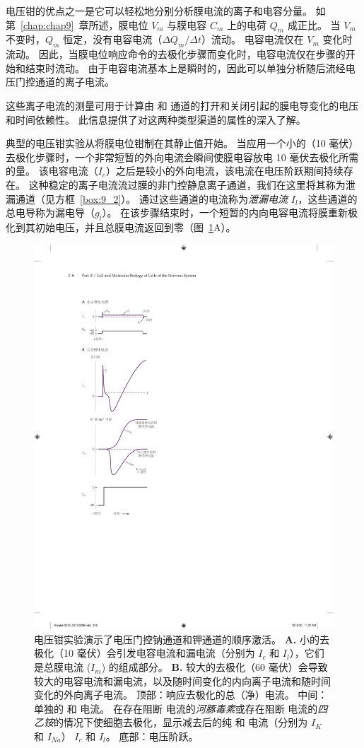 电压钳的优点之一是它可以轻松地分别分析膜电流的离子和电容分量。
如第~\ref{chap:chap9}~章所述，膜电位 $V_m$ 与膜电容 $C_m$ 上的电荷 $Q_m$ 成正比。
当 $V_m$ 不变时，$Q_m$ 恒定，没有电容电流（$\Delta Q_m / \Delta t）$流动。
电容电流仅在 $V_m$ 变化时流动。
因此，当膜电位响应命令的去极化步骤而变化时，电容电流仅在步骤的开始和结束时流动。
由于电容电流基本上是瞬时的，因此可以单独分析随后流经电压门控通道的离子电流。


这些离子电流的测量可用于计算由  和  通道的打开和关闭引起的膜电导变化的电压和时间依赖性。
此信息提供了对这两种类型渠道的属性的深入了解。


典型的电压钳实验从将膜电位钳制在其静止值开始。
当应用一个小的（10 毫伏）去极化步骤时，一个非常短暂的外向电流会瞬间使膜电容放电 10 毫伏去极化所需的量。
该电容电流（$I_c$）之后是较小的外向电流，该电流在电压阶跃期间持续存在。
这种稳定的离子电流流过膜的非门控静息离子通道，我们在这里将其称为泄漏通道（见方框~\ref{box:9_2}）。
通过这些通道的电流称为\textit{泄漏电流} $I_l$，这些通道的总电导称为漏电导（$g_l$）。
在该步骤结束时，一个短暂的内向电容电流将膜重新极化到其初始电压，并且总膜电流返回到零（图~\ref{fig:10_3}A）。


\begin{figure}[htbp]
	\centering
	\includegraphics[width=0.6\linewidth]{chap10/fig_10_3}
	\caption{电压钳实验演示了电压门控钠通道和钾通道的顺序激活。 
		\textbf{A.} 小的去极化（10 毫伏）会引发电容电流和漏电流（分别为 $I_c$ 和 $I_l$），它们是总膜电流 ($I_m$) 的组成部分。
		\textbf{B.} 较大的去极化（60 毫伏）会导致较大的电容电流和漏电流，以及随时间变化的内向离子电流和随时间变化的外向离子电流。
		顶部：响应去极化的总（净）电流。
		中间：单独的  和  电流。
		在存在阻断  电流的\textit{河豚毒素}或存在阻断  电流的\textit{四乙铵}的情况下使细胞去极化，显示减去后的纯  和  电流（分别为 $I_K$ 和 $I_{Na}$） $I_c$ 和 $I_l$。
		底部：电压阶跃。}
	\label{fig:10_3}
\end{figure}



